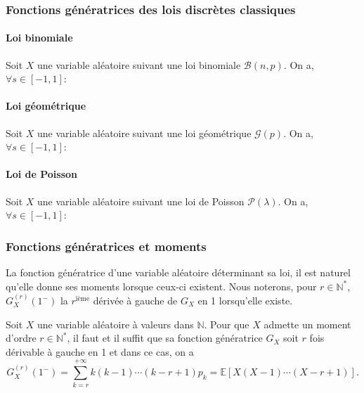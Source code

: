 \sld{\vfill\pagebreak[5]}%
\subsubsection{Fonctions génératrices des lois discrètes classiques}

\paragraph{Loi binomiale} Soit $X$ une variable aléatoire suivant une loi binomiale $\mathcal{B}(n, p)$. On a, $\forall s \in [-1,1]$:
\sld{\[ G_X(s) = \sum_{i=0}^n \binom{n}{i} p^i q^{n-i} s^i = (ps+q)^n.\]}\pl{\rep{2cm}}

\paragraph{Loi géométrique} Soit $X$ une variable aléatoire suivant une loi géométrique $\mathcal{G}(p)$. On a, $\forall s \in [-1,1]$:
\sld{\[ G_X(s) = \sum_{i=0}^{+ \infty}  p q^{i-1} s^i = \frac{ps}{1-qs}.\]}\pl{\rep{2cm}}


\paragraph{Loi de Poisson} Soit $X$ une variable aléatoire suivant une loi de Poisson $\mathcal{P}(\lambda)$. On a, $\forall s \in [-1,1]$:
\sld{\[ G_X(s) = \sum_{i=0}^{+ \infty}  e^{-\lambda} \frac{\lambda^i}{i!} s^i = \exp(\lambda s - \lambda).\]}\pl{\rep{2cm}}


\subsubsection{Fonctions génératrices et moments}

La fonction génératrice d'une variable aléatoire déterminant sa loi, il est naturel qu'elle donne ses moments lorsque ceux-ci existent. Nous noterons, pour $r \in \mathbb{N}^*$, $G_X^{(r)} (1^-)$ la $r^{\textrm{ième}}$ dérivée à gauche de $G_X$ en 1 lorsqu'elle existe.


\begin{proposition}
Soit $X$ une variable aléatoire à valeurs dans $\mathbb{N}$. Pour que $X$ admette un moment d'ordre $r \in \mathbb{N}^*$, il faut et il suffit que sa fonction génératrice $G_X$ soit $r$ fois dérivable à gauche en 1 et dans ce cas, on a  
\[ G_X^{(r)} (1^-) = \sum_{k=r}^{+\infty} k(k-1) \cdots (k-r+1) p_k = \mathbb{E} [X(X-1)\cdots (X-r+1)].\]
\end{proposition}









